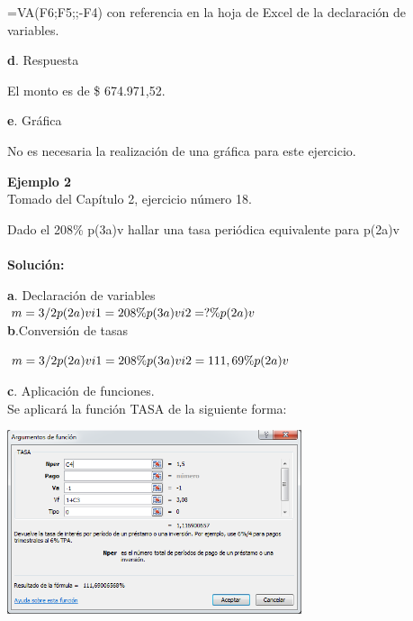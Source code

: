 =VA(F6;F5;;-F4) con referencia en la hoja de Excel de la declaración de variables.
\\ 
\vspace{2mm}

\textbf{d}. Respuesta

\vspace{2mm}

El monto es de \$ 674.971,52. 

\vspace{2mm}

\textbf{e}. Gráfica

\vspace{2mm}

No es necesaria la realización de una gráfica para este ejercicio.

\vspace{2mm}

\textbf{Ejemplo 2}\\

Tomado del Capítulo 2, ejercicio número 18.

\vspace{2mm}

Dado el  208\% p(3a)v hallar una tasa periódica equivalente para p(2a)v
\\\\
\textbf{Solución:}
\vspace{2mm}

\textbf{a}. Declaración de variables\\

	
	    
	$	m=3/2 p(2a)v 
		\\
		i1=208\% p(3a)v 
		\\
		i2=?\% p(2a)v
		\\
		$
	\\

\textbf{b}.Conversión de tasas
\vspace{2mm}

	$	m=3/2 p(2a)v 
		\\
		i1=208\% p(3a)v 
		\\
		i2=111,69\% p(2a)v
		\\
		$
\vspace{1mm}

\textbf{c}. Aplicación de funciones.
 \\
 
Se aplicará la función TASA de la siguiente forma:     
 
 \begin{center}
	\includegraphics[height=5.4cm]{img/ch8/8_12.png}
\end{center}

